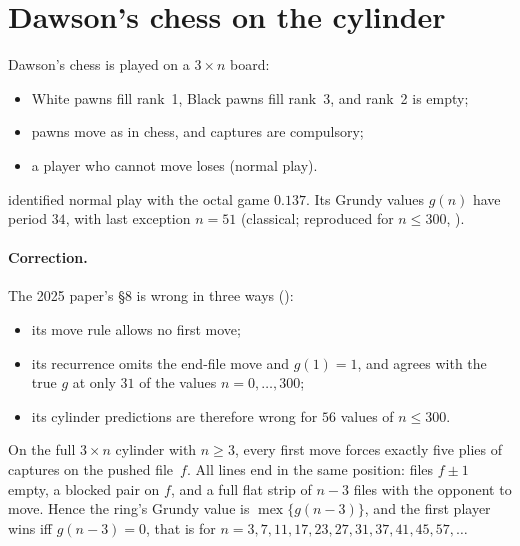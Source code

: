 \section{Dawson's chess on the cylinder}\label{sec:dawson}

Dawson's chess \citep{Dawson1935} is played on a $3\times n$ board:
\begin{itemize}
\item White pawns fill rank~1, Black pawns fill rank~3, and rank~2 is empty;
\item pawns move as in chess, and captures are compulsory;
\item a player who cannot move loses (normal play).
\end{itemize}
\citet{GuySmith1956} identified normal play with the octal game $0.137$. Its Grundy values $g(n)$ have
period $34$, with last exception $n=51$ (classical; reproduced for $n\le300$, ).

\paragraph{Correction.} The 2025 paper's \S8 is wrong in three ways ():
\begin{itemize}
\item its move rule allows no first move;
\item its recurrence omits the end-file move and $g(1)=1$, and agrees with the true $g$ at only $31$ of the
  values $n=0,\dots,300$;
\item its cylinder predictions are therefore wrong for $56$ values of $n\le300$.
\end{itemize}

\begin{theorem}\label{thm:ring}
On the full $3\times n$ cylinder with $n\ge3$, every first move forces exactly five plies of captures on the
pushed file~$f$. All lines end in the same position: files $f\pm1$ empty, a blocked pair on $f$, and a full flat
strip of $n-3$ files with the opponent to move. Hence the ring's Grundy value is $\operatorname{mex}\{g(n-3)\}$,
and the first player wins iff $g(n-3)=0$, that is for
$n=3,7,11,17,23,27,31,37,41,45,57,\dots$
\end{theorem}

